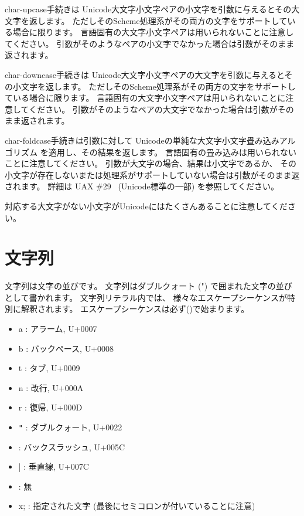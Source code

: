 \begin{entry}{%
}


{\cf char-upcase}手続きは
Unicode大文字小文字ペアの小文字を引数に与えるとその大文字を返します。
ただしそのScheme処理系がその両方の文字をサポートしている場合に限ります。
言語固有の大文字小文字ペアは用いられないことに注意してください。
引数がそのようなペアの小文字でなかった場合は引数がそのまま返されます。

{\cf char-downcase}手続きは
Unicode大文字小文字ペアの大文字を引数に与えるとその小文字を返します。
ただしそのScheme処理系がその両方の文字をサポートしている場合に限ります。
言語固有の大文字小文字ペアは用いられないことに注意してください。
引数がそのようなペアの大文字でなかった場合は引数がそのまま返されます。

{\cf char-foldcase}手続きは引数に対して
Unicodeの単純な大文字小文字畳み込みアルゴリズム
を適用し、その結果を返します。
言語固有の畳み込みは用いられないことに注意してください。
引数が大文字の場合、結果は小文字であるか、
その小文字が存在しないまたは処理系がサポートしていない場合は引数がそのまま返されます。
詳細は UAX \#29~\cite{uax29} (Unicode標準の一部) を参照してください。

対応する大文字がない小文字がUnicodeにはたくさんあることに注意してください。

\end{entry}


\section{文字列}
\label{stringsection}

文字列は文字の並びです。
\vest 文字列はダブルクォート ({\cf "}) で囲まれた文字の並びとして書かれます。
文字列リテラル内では、
様々なエスケープシーケンスが特別に解釈されます。
エスケープシーケンスは必ず(\backwhack{})で始まります。

\begin{itemize}
\item{\cf\backwhack{}a} : アラーム, U+0007
\item{\cf\backwhack{}b} : バックペース, U+0008 
\item{\cf\backwhack{}t} : タブ, U+0009 
\item{\cf\backwhack{}n} : 改行, U+000A 
\item{\cf\backwhack{}r} : 復帰, U+000D 
\item{\cf\backwhack{}}\verb|"| : ダブルクォート, U+0022 
\item{\cf\backwhack{}\backwhack{}} : バックスラッシュ, U+005C 
\item{\cf\backwhack{}|} : 垂直線, U+007C
\item{\cf\backwhack{}
      } : 無
\item{\cf\backwhack{}x;} : 指定された文字
(最後にセミコロンが付いていることに注意)
\end{itemize}

